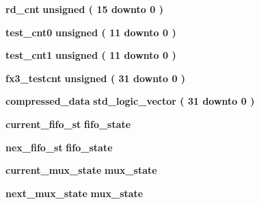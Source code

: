 \begin{DoxyCompactItemize}
{\bf rd\+\_\+cnt} {\bfseries \textcolor{comment}{unsigned}\textcolor{vhdlchar}{ }\textcolor{vhdlchar}{(}\textcolor{vhdlchar}{ }\textcolor{vhdlchar}{ } \textcolor{vhdldigit}{15} \textcolor{vhdlchar}{ }\textcolor{keywordflow}{downto}\textcolor{vhdlchar}{ }\textcolor{vhdlchar}{ } \textcolor{vhdldigit}{0} \textcolor{vhdlchar}{ }\textcolor{vhdlchar}{)}\textcolor{vhdlchar}{ }} 
\item 
{\bf test\+\_\+cnt0} {\bfseries \textcolor{comment}{unsigned}\textcolor{vhdlchar}{ }\textcolor{vhdlchar}{(}\textcolor{vhdlchar}{ }\textcolor{vhdlchar}{ } \textcolor{vhdldigit}{11} \textcolor{vhdlchar}{ }\textcolor{keywordflow}{downto}\textcolor{vhdlchar}{ }\textcolor{vhdlchar}{ } \textcolor{vhdldigit}{0} \textcolor{vhdlchar}{ }\textcolor{vhdlchar}{)}\textcolor{vhdlchar}{ }} 
\item 
{\bf test\+\_\+cnt1} {\bfseries \textcolor{comment}{unsigned}\textcolor{vhdlchar}{ }\textcolor{vhdlchar}{(}\textcolor{vhdlchar}{ }\textcolor{vhdlchar}{ } \textcolor{vhdldigit}{11} \textcolor{vhdlchar}{ }\textcolor{keywordflow}{downto}\textcolor{vhdlchar}{ }\textcolor{vhdlchar}{ } \textcolor{vhdldigit}{0} \textcolor{vhdlchar}{ }\textcolor{vhdlchar}{)}\textcolor{vhdlchar}{ }} 
\item 
{\bf fx3\+\_\+testcnt} {\bfseries \textcolor{comment}{unsigned}\textcolor{vhdlchar}{ }\textcolor{vhdlchar}{(}\textcolor{vhdlchar}{ }\textcolor{vhdlchar}{ } \textcolor{vhdldigit}{31} \textcolor{vhdlchar}{ }\textcolor{keywordflow}{downto}\textcolor{vhdlchar}{ }\textcolor{vhdlchar}{ } \textcolor{vhdldigit}{0} \textcolor{vhdlchar}{ }\textcolor{vhdlchar}{)}\textcolor{vhdlchar}{ }} 
\item 
{\bf compressed\+\_\+data} {\bfseries \textcolor{comment}{std\+\_\+logic\+\_\+vector}\textcolor{vhdlchar}{ }\textcolor{vhdlchar}{(}\textcolor{vhdlchar}{ }\textcolor{vhdlchar}{ } \textcolor{vhdldigit}{31} \textcolor{vhdlchar}{ }\textcolor{keywordflow}{downto}\textcolor{vhdlchar}{ }\textcolor{vhdlchar}{ } \textcolor{vhdldigit}{0} \textcolor{vhdlchar}{ }\textcolor{vhdlchar}{)}\textcolor{vhdlchar}{ }} 
\item 
{\bf current\+\_\+fifo\+\_\+st} {\bfseries {\bfseries {\bf fifo\+\_\+state}} \textcolor{vhdlchar}{ }} 
\item 
{\bf nex\+\_\+fifo\+\_\+st} {\bfseries {\bfseries {\bf fifo\+\_\+state}} \textcolor{vhdlchar}{ }} 
\item 
{\bf current\+\_\+mux\+\_\+state} {\bfseries {\bfseries {\bf mux\+\_\+state}} \textcolor{vhdlchar}{ }} 
\item 
{\bf next\+\_\+mux\+\_\+state} {\bfseries {\bfseries {\bf mux\+\_\+state}} \textcolor{vhdlchar}{ }} 

\end{DoxyCompactItemize}
